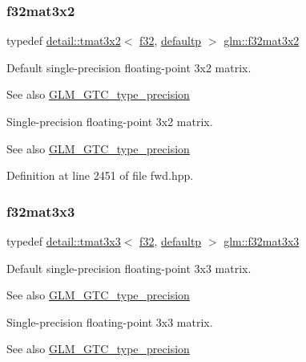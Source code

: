 \subsubsection{\texorpdfstring{f32mat3x2}{f32mat3x2}}
{\footnotesize\ttfamily typedef \hyperlink{structglm_1_1detail_1_1tmat3x2}{detail\+::tmat3x2}$<$ \hyperlink{group__gtc__type__precision_ga0ec999b57f5330d9021256e96038df04}{f32}, \hyperlink{namespaceglm_a0f04f086094c747d227af4425893f545a9d21ccd8b5a009ec7eb7677befc3bf51}{defaultp} $>$ \hyperlink{group__gtc__type__precision_ga43fa9ba1875db74cba2cea33321a77ff}{glm\+::f32mat3x2}}

Default single-\/precision floating-\/point 3x2 matrix. \begin{DoxySeeAlso}{See also}
\hyperlink{group__gtc__type__precision}{G\+L\+M\+\_\+\+G\+T\+C\+\_\+type\+\_\+precision}
\end{DoxySeeAlso}
Single-\/precision floating-\/point 3x2 matrix. \begin{DoxySeeAlso}{See also}
\hyperlink{group__gtc__type__precision}{G\+L\+M\+\_\+\+G\+T\+C\+\_\+type\+\_\+precision} 
\end{DoxySeeAlso}


Definition at line 2451 of file fwd.\+hpp.

\mbox{\label{group__gtc__type__precision_ga56465dc40dd0e35221f00bdf44fb7c2e}} 
\subsubsection{\texorpdfstring{f32mat3x3}{f32mat3x3}}
{\footnotesize\ttfamily typedef \hyperlink{structglm_1_1detail_1_1tmat3x3}{detail\+::tmat3x3}$<$ \hyperlink{group__gtc__type__precision_ga0ec999b57f5330d9021256e96038df04}{f32}, \hyperlink{namespaceglm_a0f04f086094c747d227af4425893f545a9d21ccd8b5a009ec7eb7677befc3bf51}{defaultp} $>$ \hyperlink{group__gtc__type__precision_ga56465dc40dd0e35221f00bdf44fb7c2e}{glm\+::f32mat3x3}}

Default single-\/precision floating-\/point 3x3 matrix. \begin{DoxySeeAlso}{See also}
\hyperlink{group__gtc__type__precision}{G\+L\+M\+\_\+\+G\+T\+C\+\_\+type\+\_\+precision}
\end{DoxySeeAlso}
Single-\/precision floating-\/point 3x3 matrix. \begin{DoxySeeAlso}{See also}
\hyperlink{group__gtc__type__precision}{G\+L\+M\+\_\+\+G\+T\+C\+\_\+type\+\_\+precision} 
\end{DoxySeeAlso}


